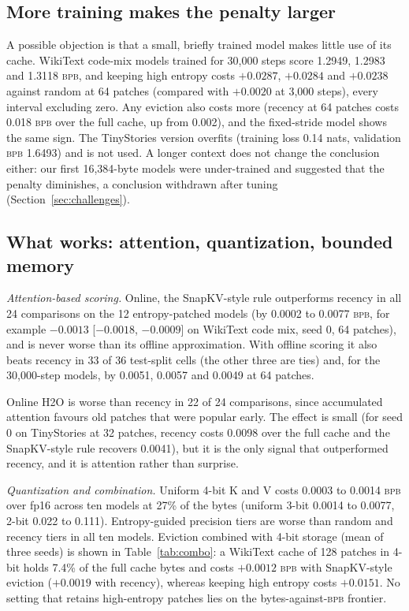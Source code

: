 \documentclass[10pt,twocolumn]{extarticle}
\newcommand{\bpb}{\textsc{bpb}}
\begin{document}
\subsection{More training makes the penalty larger}\label{sec:scale}
A possible objection is that a small, briefly trained model makes little use of its cache. WikiText code-mix models trained for 30,000 steps score 1.2949, 1.2983 and 1.3118 \bpb{}, and keeping high entropy costs $+0.0287$, $+0.0284$ and $+0.0238$ against random at 64 patches (compared with $+0.0020$ at 3,000 steps), every interval excluding zero. Any eviction also costs more (recency at 64 patches costs 0.018 \bpb{} over the full cache, up from 0.002), and the fixed-stride model shows the same sign. The TinyStories version overfits (training loss 0.14 nats, validation \bpb{} 1.6493) and is not used. A longer context does not change the conclusion either: our first 16,384-byte models were under-trained and suggested that the penalty diminishes, a conclusion withdrawn after tuning (Section~\ref{sec:challenges}).

\subsection{What works: attention, quantization, bounded memory}
\textit{Attention-based scoring.}\label{sec:attn} Online, the SnapKV-style rule outperforms recency in all 24 comparisons on the 12 entropy-patched models (by 0.0002 to 0.0077 \bpb, for example $-0.0013$ [$-0.0018$, $-0.0009$] on WikiText code mix, seed 0, 64 patches), and is never worse than its offline approximation. With offline scoring it also beats recency in 33 of 36 test-split cells (the other three are ties) and, for the 30,000-step models, by 0.0051, 0.0057 and 0.0049 at 64 patches.

Online H2O is worse than recency in 22 of 24 comparisons, since accumulated attention favours old patches that were popular early. The effect is small (for seed 0 on TinyStories at 32 patches, recency costs 0.0098 over the full cache and the SnapKV-style rule recovers 0.0041), but it is the only signal that outperformed recency, and it is attention rather than surprise.


\textit{Quantization and combination.} Uniform 4-bit K and V costs 0.0003 to 0.0014 \bpb{} over fp16 across ten models at 27\% of the bytes (uniform 3-bit 0.0014 to 0.0077, 2-bit 0.022 to 0.111). Entropy-guided precision tiers are worse than random and recency tiers in all ten models. Eviction combined with 4-bit storage (mean of three seeds) is shown in Table~\ref{tab:combo}: a WikiText cache of 128 patches in 4-bit holds 7.4\% of the full cache bytes and costs $+0.0012$ \bpb{} with SnapKV-style eviction ($+0.0019$ with recency), whereas keeping high entropy costs $+0.0151$. No setting that retains high-entropy patches lies on the bytes-against-\bpb{} frontier.
\end{document}
